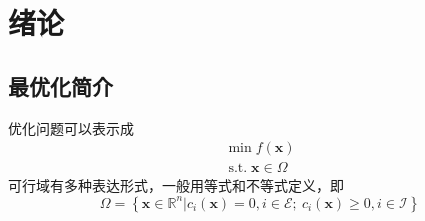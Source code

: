 \section{绪论}

\subsection{最优化简介}
优化问题可以表示成
\[
    \begin{array}{c}
        \min f(\boldsymbol{x})\\
        \operatorname{s.t.} \boldsymbol{x}\in \Omega
    \end{array}
\]
可行域有多种表达形式，一般用等式和不等式定义，即
\[
    \Omega = \left\{ \boldsymbol{x}\in\mathbb{R}^n|c_{i}(\boldsymbol{x}) = 0,i\in \mathcal{E};\ c_{i}(\boldsymbol{x})\geqslant 0,i\in\mathcal{I}  \right\}
\]

